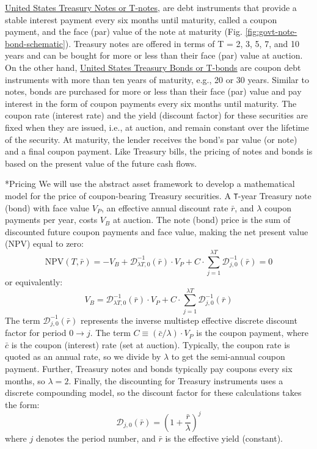 \documentclass[11pt]{article}
\makeatletter
\theoremstyle{definition}
\renewcommand\subsubsection{\@startsection
	{subsubsection}{2}{0mm}
	{-0.05in}
	{-0.5\baselineskip}
	{\normalfont\normalsize\itshape\bfseries}}
\makeatother
\begin{document}
\href{https://treasurydirect.gov/marketable-securities/treasury-notes/}{United States Treasury Notes or T-notes}, 
are debt instruments that provide a stable interest payment every six months until maturity, called a coupon payment, and the face (par) value of the note at maturity (Fig. \ref{fig:govt-note-bond-schematic}).
Treasury notes are offered in terms of T = 2, 3, 5, 7, and 10 years and can be bought for more or less than their face (par) value at auction.
 On the other hand,  \href{https://treasurydirect.gov/marketable-securities/treasury-bonds/}{United States Treasury Bonds or T-bonds} 
are coupon debt instruments with more than ten years of maturity, e.g., 20 or 30 years. Similar to notes, bonds are purchased for more or less than their face (par) value and pay interest in the form of coupon payments every six months until maturity.
The coupon rate (interest rate) and the yield (discount factor) for these securities are fixed when they are issued, i.e., at auction, and remain constant over the lifetime of the security.
At maturity, the lender receives the bond's par value (or note) and a final coupon payment. 
Like Treasury bills, the pricing of notes and bonds is based on the present value of the future cash flows. 

\subsubsection*{Pricing}
We will use the abstract asset framework to develop a mathematical model for the price of coupon-bearing Treasury securities.
A \texttt{T}-year Treasury note (bond) with face value $V_{P}$, an effective annual discount rate $\bar{r}$, and $\lambda$ coupon payments per year, costs $V_{B}$ at auction.
The note (bond) price is the sum of discounted future coupon payments and face value, making the net present value (NPV) equal to zero:
\begin{equation}
\text{NPV}(T,\bar{r}) = -V_{B} + \mathcal{D}^{-1}_{\lambda{T},0}(\bar{r})\cdot{V_{P}}+C\cdot\sum_{j=1}^{\lambda{T}}\mathcal{D}_{j,0}^{-1}(\bar{r}) = 0
\end{equation}
or equivalently:
\begin{equation}
V_{B} = \mathcal{D}^{-1}_{\lambda{T},0}(\bar{r})\cdot{V_{P}}+C\cdot\sum_{j=1}^{\lambda{T}}\mathcal{D}_{j,0}^{-1}(\bar{r})
\end{equation}
The term $\mathcal{D}_{j,0}^{-1}(\bar{r})$ represents the inverse multistep effective discrete discount factor for period $0\rightarrow{j}$. 
The term $C\equiv(\bar{c}/\lambda)\cdot{V_{P}}$ is the coupon payment, where $\bar{c}$ is the coupon (interest) rate (set at auction).
Typically, the coupon rate is quoted as an annual rate, so we divide by $\lambda$ to get the semi-annual coupon payment.
Further, Treasury notes and bonds typically pay coupons every six months, so $\lambda=2$.
Finally, the discounting for Treasury instruments uses a discrete compounding model, so the discount factor for these calculations takes the form:
\begin{equation}
\mathcal{D}_{j,0}(\bar{r}) = \left(1+\frac{\bar{r}}{\lambda}\right)^{j}
\end{equation}
where $j$ denotes the period number, and $\bar{r}$ is the effective yield (constant).
\end{document}
